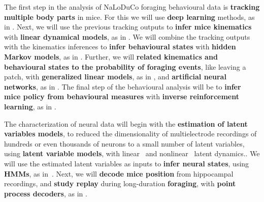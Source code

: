 \documentclass[12pt]{article}
\begin{document}
The first step in the analysis of NaLoDuCo foraging behavioural data is
\textbf{tracking multiple body parts} in mice. For this we will use
\textbf{deep learning} methods, as in
\citep{https://pubmed.ncbi.nlm.nih.gov/30127430/}.
%
Next, we will use the previous tracking outputs to \textbf{infer mice
kinematics} with \textbf{linear dynamical models}, as in
\citep{https://github.com/joacorapela/lds}.
%
We will combine the tracking outputs with the kinematics inferences to
\textbf{infer behavioural states} with \textbf{hidden Markov models}, as in
\citep{https://pubmed.ncbi.nlm.nih.gov/26687221/}.
%
Further, we will \textbf{related kinematics and behavioural states to the
probability of foraging events}, like leaving a patch, with \textbf{generalized
linear models}, as in \citep{}, and \textbf{artificial neural networks}, as in \citep{}.
%
The final step of the behavioural analysis will be to \textbf{infer mice policy
from behavioural measures} with \textbf{inverse reinforcement learning}, as in
\cite{https://arxiv.org/abs/2311.13870v2}.

The characterization of neural data will begin with the \textbf{estimation of latent
variables models}, to reduced the dimensionality of multielectrode recordings of
hundreds or even thousands of neurons to a small number of latent variables,
using \textbf{latent variable models}, with linear~\citep{dunckerAndSahanai18}
and nonlinear~\citep{pandarinathEtAl} latent dynamics..
%
We will use the estimated latent variables as inputs to
\textbf{infer neural states}, using \textbf{HMMs}, as in~\citep{}.
%
Next, we will \textbf{decode mice position} from hippocampal recordings, and
\textbf{study
replay} during long-duration \textbf{foraging}, with \textbf{point process
decoders}, as in \citep{ppDecoder}.
\end{document}

